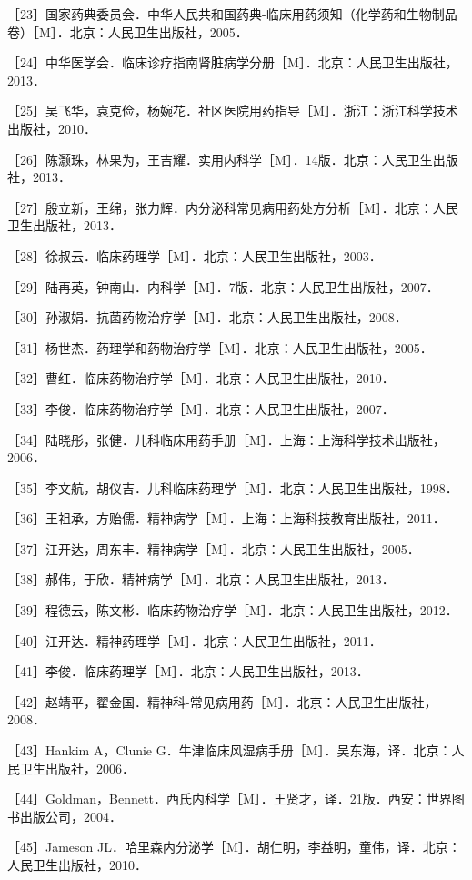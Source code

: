 ［23］国家药典委员会．中华人民共和国药典-临床用药须知（化学药和生物制品卷）［M］．北京：人民卫生出版社，2005．

［24］中华医学会．临床诊疗指南肾脏病学分册［M］．北京：人民卫生出版社，2013．

［25］吴飞华，袁克俭，杨婉花．社区医院用药指导［M］．浙江：浙江科学技术出版社，2010．

［26］陈灏珠，林果为，王吉耀．实用内科学［M］．14版．北京：人民卫生出版社，2013．

［27］殷立新，王绵，张力辉．内分泌科常见病用药处方分析［M］．北京：人民卫生出版社，2013．

［28］徐叔云．临床药理学［M］．北京：人民卫生出版社，2003．

［29］陆再英，钟南山．内科学［M］．7版．北京：人民卫生出版社，2007．

［30］孙淑娟．抗菌药物治疗学［M］．北京：人民卫生出版社，2008．

［31］杨世杰．药理学和药物治疗学［M］．北京：人民卫生出版社，2005．

［32］曹红．临床药物治疗学［M］．北京：人民卫生出版社，2010．

［33］李俊．临床药物治疗学［M］．北京：人民卫生出版社，2007．

［34］陆晓彤，张健．儿科临床用药手册［M］．上海：上海科学技术出版社，2006．

［35］李文航，胡仪吉．儿科临床药理学［M］．北京：人民卫生出版社，1998．

［36］王祖承，方贻儒．精神病学［M］．上海：上海科技教育出版社，2011．

［37］江开达，周东丰．精神病学［M］．北京：人民卫生出版社，2005．

［38］郝伟，于欣．精神病学［M］．北京：人民卫生出版社，2013．

［39］程德云，陈文彬．临床药物治疗学［M］．北京：人民卫生出版社，2012．

［40］江开达．精神药理学［M］．北京：人民卫生出版社，2011．

［41］李俊．临床药理学［M］．北京：人民卫生出版社，2013．

［42］赵靖平，翟金国．精神科-常见病用药［M］．北京：人民卫生出版社，2008．

［43］Hankim A，Clunie
G．牛津临床风湿病手册［M］．吴东海，译．北京：人民卫生出版社，2006．

［44］Goldman，Bennett．西氏内科学［M］．王贤才，译．21版．西安：世界图书出版公司，2004．

［45］Jameson
JL．哈里森内分泌学［M］．胡仁明，李益明，童伟，译．北京：人民卫生出版社，2010．

